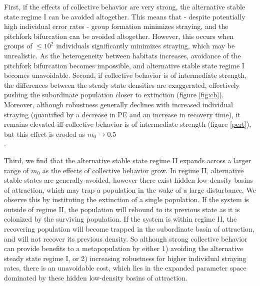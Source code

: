 \documentclass{revtex4}
\begin{document}
First, if the effects of collective behavior are very strong, the alternative stable state regime I can be avoided altogether.
This means that - despite potentially high individual error rates - group formation minimizes straying, and the pitchfork bifurcation can be avoided altogether.
However, this occurs when groups of $\leq 10^2$ individuals significantly minimizes straying, which may be unrealistic.
As the heterogeneity between habitats increases, avoidance of the pitchfork bifurcation becomes impossible, and alternative stable state regime I becomes unavoidable.
Second, if collective behavior is of intermediate strength, the differences between the steady state densities are exaggerated, effectively pushing the subordinate population closer to extinction (figure \ref{fig:cb}).
Moreover, although robustness generally declines with increased individual straying (quantified by a decrease in PE and an increase in recovery time), it remains elevated iff collective behavior is of intermediate strength (figure \ref{pert}), but this effect is eroded as $m_0 \rightarrow 0.5$\\.


Third, we find that the alternative stable state regime II expands across a larger range of $m_0$ as the effects of collective behavior grow.
In regime II, alternative stable states are generally avoided, however there exist hidden low-density basins of attraction, which may trap a population in the wake of a large disturbance.
We observe this by instituting the extinction of a single population.
If the system is outside of regime II, the population will rebound to its previous state as it is colonized by the surviving population.
If the system is within regime II, the recovering population will become trapped in the subordinate basin of attraction, and will not recover its previous density.
So although strong collective behavior can provide benefits to a metapopulation by either
1) avoiding the alternative steady state regime I, or
2) increasing robustness for higher individual straying rates,
there is an unavoidable cost, which lies in the expanded parameter space dominated by these hidden low-density basins of attraction.
\end{document}
